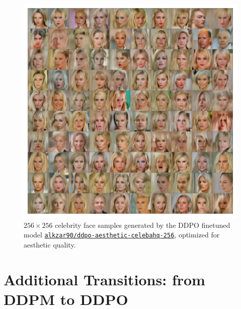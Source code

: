 \begin{appendixs}
        \begin{figure}
            \centering
            \includegraphics[scale=0.8]{img/results/ddpo-aesthetic-samples.png}
            \vspace{-4pt}  %
            \captionsetup{width=\textwidth} %
            \caption{$256\times256$ celebrity face samples generated by the DDPO finetuned model \href{https://huggingface.co/alkzar90/ddpo-aesthetic-celebahq-256}{\texttt{\texttt{alkzar90/ddpo-aesthetic-celebahq-256}}}, optimized for aesthetic quality.}
            \label{fig:ddpo-aesthetic-samples}
        \end{figure}



    \newpage

    \section{Additional Transitions: from DDPM to DDPO}


\end{appendixs}
